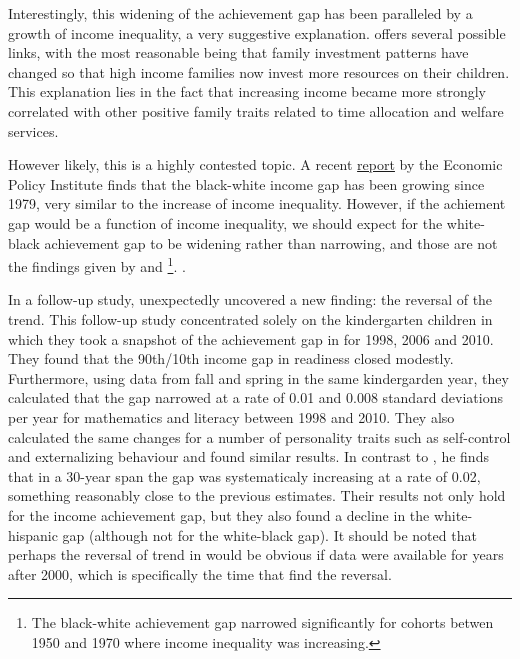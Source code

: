 \documentclass[11pt, a4paper]{article}\usepackage[]{graphicx}\usepackage[]{color}
\begin{document}
Interestingly, this widening of the achievement gap has been paralleled by a growth of income inequality, a very suggestive explanation. \citet{reardon2011} offers several possible links, with the most reasonable being that family investment patterns have changed so that high income families now invest more resources on their children. This explanation lies in the fact that increasing income became more strongly correlated with other positive family traits related to time allocation and welfare services.

However likely, this is a highly contested topic. A recent \href{http://www.epi.org/files/pdf/101972.pdf}{report} by the Economic Policy Institute finds that the black-white income gap has been growing since 1979, very similar to the increase of income inequality. However, if the achiement gap would be a function of income inequality, we should expect for the white-black achievement gap to be widening rather than narrowing, and those are not the findings given by \citet{reardon2011} and \citet{magnuson2008} \footnote{The black-white achievement gap narrowed significantly for cohorts betwen 1950 and 1970 where income inequality was increasing.}.
.

In a follow-up study, \citet{reardon_portilla} unexpectedly uncovered a new finding: the reversal of the trend. This follow-up study concentrated solely on the kindergarten children in which they took a snapshot of the achievement gap in for 1998, 2006 and 2010. They found that the 90th/10th income gap in readiness closed modestly. Furthermore, using data from fall and spring in the same kindergarden year, they calculated that the gap narrowed at a rate of 0.01 and 0.008 standard deviations per year for mathematics and literacy between 1998 and 2010. They also calculated the same changes for a number of personality traits such as self-control and externalizing behaviour and found similar results. In contrast to \citet{reardon2011}, he finds that in a 30-year span the gap was systematicaly increasing at a rate of 0.02, something reasonably close to the previous estimates. Their results not only hold for the income achievement gap, but they also found a decline in the white-hispanic gap (although not for the white-black gap). It should be noted that perhaps the reversal of trend in \citet{reardon2011} would be obvious if data were available for years after 2000,  which is specifically the time that \citet{reardon_portilla} find the reversal.
\end{document}
